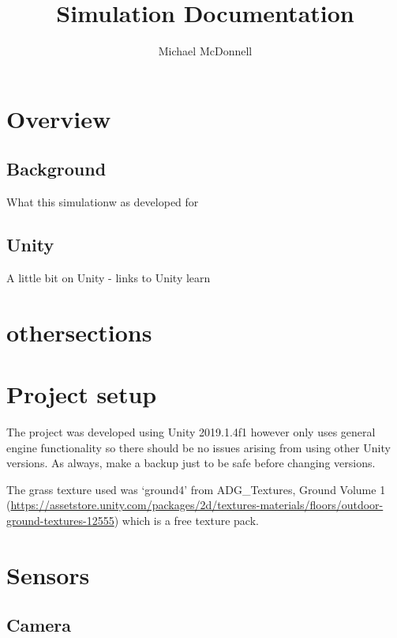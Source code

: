 \documentclass{article}
\begin{document}
\title{Simulation Documentation}
\author{Michael McDonnell}

\maketitle

\tableofcontents

\section*{Overview}

\subsection{Background}

What this simulationw as developed for

\subsection{Unity}
A little bit on Unity - links to Unity learn


\section*{othersections}

\section{Project setup}

The project was developed using Unity 2019.1.4f1 however only uses general engine functionality so there should be no issues arising from using other Unity versions. As always, make a backup just to be safe before changing versions.



The grass texture used was `ground4' from ADG\_Textures, Ground Volume 1 (\url{https://assetstore.unity.com/packages/2d/textures-materials/floors/outdoor-ground-textures-12555}) which is a free texture pack.
 

\section{Sensors}

\subsection{Camera}
\end{document}
